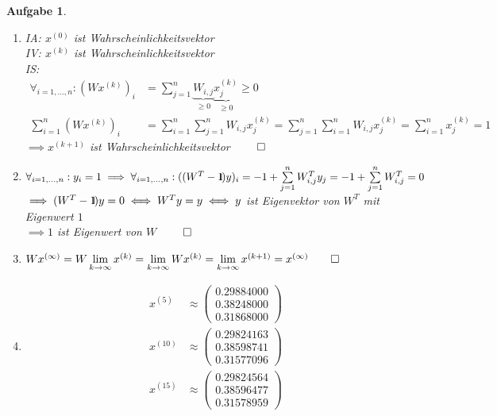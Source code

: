 \documentclass[11pt]{article}
\theoremstyle{break}
\newtheorem{task}{Aufgabe}
\def\1{\ensuremath{{\normalfont\hbox{1\kern-0.18em \vrule width .6pt}}}}
\begin{document}
\begin{task}
    \hfill\vspace{-5mm}
    \begin{enumerate}[label={(\alph*)}]
        \item IA: $x^{(0)}$ ist Wahrscheinlichkeitsvektor\\
        IV: $x^{(k)}$ ist Wahrscheinlichkeitsvektor\\
        IS: 
        \begin{align*}
            \forall_{i=1, \ldots, n}: \left(Wx^{(k)}\right)_i &= \sum\limits_{j=1}^{n} \underbrace{W_{i,j}}_{\geq 0} \underbrace{x^{(k)}_j}_{\geq 0} \geq 0\\
            \sum\limits_{i=1}^n \left(Wx^{(k)}\right)_i &= \sum\limits_{i=1}^n \sum\limits_{j=1}^{n} W_{i,j} x^{(k)}_j = \sum\limits_{j=1}^n \sum\limits_{i=1}^{n} W_{i,j} x^{(k)}_j = \sum\limits_{i=1}^n x^{(k)}_j = 1
        \end{align*}
        $\implies x^{(k+1)}$ ist Wahrscheinlichkeitsvektor $\hfill\qed$

        \item $\forall_{i=1, \ldots, n}: y_i = 1 \implies \forall_{i=1, \ldots, n}: ((W^T - \1)y)_i = -1 + \sum\limits_{j=1}^{n} W^T_{i,j} y_j = -1 + \sum\limits_{j=1}^{n} W^T_{i,j} = 0$\\
        $\implies (W^T - \1)y = 0 \iff W^Ty = y \iff y$ ist Eigenvektor von $W^T$ mit Eigenwert $1$\\
        $\implies 1$ ist Eigenwert von $W$ $\hfill\qed$

        \item $W x^{(\infty)} = W \lim\limits_{k\rightarrow\infty} x^{(k)} = \lim\limits_{k\rightarrow\infty} W x^{(k)} = \lim\limits_{k\rightarrow\infty} x^{(k+1)} = x^{(\infty)}\hfill\qed$
        \item \hfill\vspace{-5mm}
        \begin{align*}
            x^{(5)} &\approx \begin{pmatrix}
                0.29884000\\
                0.38248000\\
                0.31868000
            \end{pmatrix}\\
            x^{(10)} &\approx \begin{pmatrix}
                0.29824163\\
                0.38598741\\
                0.31577096
            \end{pmatrix}\\
            x^{(15)} &\approx \begin{pmatrix}
                0.29824564\\
                0.38596477\\
                0.31578959
            \end{pmatrix}
        \end{align*}
    \end{enumerate}
\end{task}
\end{document}
